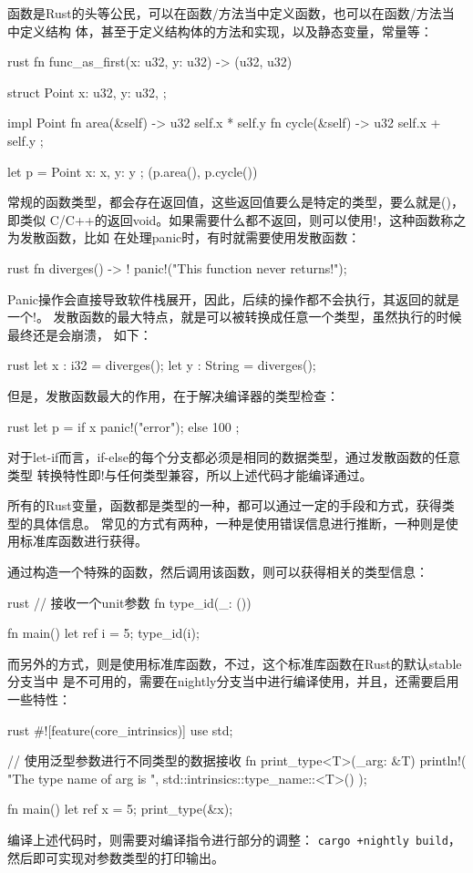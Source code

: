 函数是Rust的头等公民，可以在函数/方法当中定义函数，也可以在函数/方法当中定义结构
体，甚至于定义结构体的方法和实现，以及静态变量，常量等：
\begin{code-block}{rust}
fn func_as_first(x: u32, y: u32) -> (u32, u32) {
    struct Point {
        x: u32,
        y: u32,
    };

    impl Point {
        fn area(&self) -> u32 {
            self.x * self.y
        }
        fn cycle(&self) -> u32 {
            self.x + self.y
        }
    };

    let p = Point { x: x, y: y };
    (p.area(), p.cycle())
}
\end{code-block}

常规的函数类型，都会存在返回值，这些返回值要么是特定的类型，要么就是()，即类似
C/C++的返回void。如果需要什么都不返回，则可以使用!，这种函数称之为发散函数，比如
在处理panic时，有时就需要使用发散函数：
\begin{code-block}{rust}
fn diverges() -> ! {
    panic!("This function never returns!");
}
\end{code-block}
Panic操作会直接导致软件栈展开，因此，后续的操作都不会执行，其返回的就是一个!。
发散函数的最大特点，就是可以被转换成任意一个类型，虽然执行的时候最终还是会崩溃，
如下：
\begin{code-block}{rust}
let x : i32 = diverges();
let y : String = diverges();
\end{code-block}
但是，发散函数最大的作用，在于解决编译器的类型检查：
\begin{code-block}{rust}
let p = if x {
    panic!("error");
} else {
    100
};
\end{code-block}
对于let-if而言，if-else的每个分支都必须是相同的数据类型，通过发散函数的任意类型
转换特性即!与任何类型兼容，所以上述代码才能编译通过。

所有的Rust变量，函数都是类型的一种，都可以通过一定的手段和方式，获得类型的具体信息。
常见的方式有两种，一种是使用错误信息进行推断，一种则是使用标准库函数进行获得。

通过构造一个特殊的函数，然后调用该函数，则可以获得相关的类型信息：
\begin{code-block}{rust}
// 接收一个unit参数
fn type_id(_: ()) {}

fn main() {
    let ref i = 5;
    type_id(i);
}
\end{code-block}

而另外的方式，则是使用标准库函数，不过，这个标准库函数在Rust的默认stable分支当中
是不可用的，需要在nightly分支当中进行编译使用，并且，还需要启用一些特性：
\begin{code-block}{rust}
#![feature(core_intrinsics)]
use std;

// 使用泛型参数进行不同类型的数据接收
fn print_type<T>(_arg: &T) {
    println!(
        "The type name of arg is {}",
        std::intrinsics::type_name::<T>()
    );
}

fn main() {
    let ref x = 5;
    print_type(&x);
}
\end{code-block}
编译上述代码时，则需要对编译指令进行部分的调整：
\texttt{cargo +nightly build}，
然后即可实现对参数类型的打印输出。


